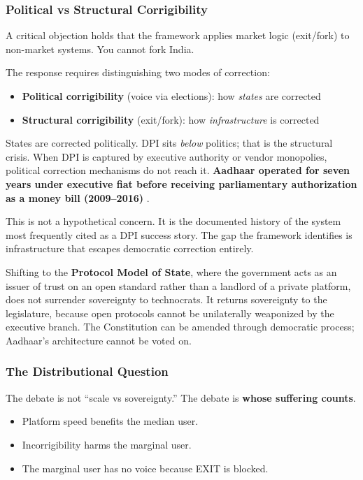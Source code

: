 \documentclass{article}
\begin{document}
\subsubsection{Political vs Structural Corrigibility}
\label{subsec:political-structural}

A critical objection holds that the framework applies market logic (exit/fork) to non-market systems. You cannot fork India.

The response requires distinguishing two modes of correction:

\begin{itemize}
    \item \textbf{Political corrigibility} (voice via elections): how \textit{states} are corrected
    \item \textbf{Structural corrigibility} (exit/fork): how \textit{infrastructure} is corrected
\end{itemize}

States are corrected politically. DPI sits \textit{below} politics; that is the structural crisis. When DPI is captured by executive authority or vendor monopolies, political correction mechanisms do not reach it. \textbf{Aadhaar operated for seven years under executive fiat before receiving parliamentary authorization as a money bill (2009--2016)} \citep{bhatia2019}.

This is not a hypothetical concern. It is the documented history of the system most frequently cited as a DPI success story. The gap the framework identifies is infrastructure that escapes democratic correction entirely.

Shifting to the \textbf{Protocol Model of State}, where the government acts as an issuer of trust on an open standard rather than a landlord of a private platform, does not surrender sovereignty to technocrats. It returns sovereignty to the legislature, because open protocols cannot be unilaterally weaponized by the executive branch. The Constitution can be amended through democratic process; Aadhaar's architecture cannot be voted on.

\subsubsection{The Distributional Question}
\label{subsec:distributional}

The debate is not ``scale vs sovereignty.'' The debate is \textbf{whose suffering counts}.

\begin{itemize}
    \item Platform speed benefits the median user.
    \item Incorrigibility harms the marginal user.
    \item The marginal user has no voice because EXIT is blocked.
\end{itemize}
\end{document}
